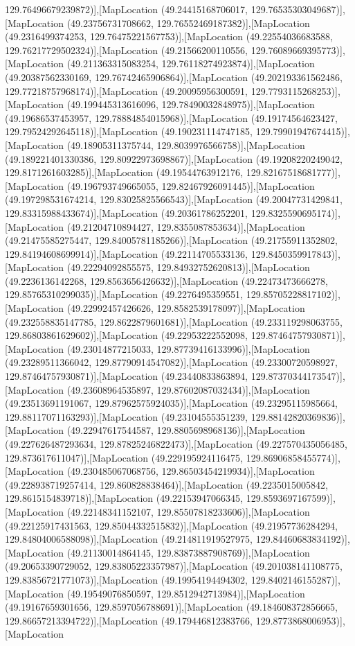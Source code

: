 129.76496679239872)],[MapLocation (49.24415168706017, 129.76535303049687)],[MapLocation (49.23756731708662, 129.76552469187382)],[MapLocation (49.2316499374253, 129.76475221567753)],[MapLocation (49.22554036683588, 129.76217729502324)],[MapLocation (49.21566200110556, 129.76089669395773)],[MapLocation (49.211363315083254, 129.76118274923874)],[MapLocation (49.20387562330169, 129.76742465906864)],[MapLocation (49.202193361562486, 129.77218757968174)],[MapLocation (49.20095956300591, 129.7793115268253)],[MapLocation (49.199445313616096, 129.78490032848975)],[MapLocation (49.19686537453957, 129.78884854015968)],[MapLocation (49.19174564623427, 129.79524292645118)],[MapLocation (49.190231114747185, 129.79901947674415)],[MapLocation (49.18905311375744, 129.8039976566758)],[MapLocation (49.189221401330386, 129.80922973698867)],[MapLocation (49.19208220249042, 129.8171261603285)],[MapLocation (49.19544763912176, 129.82167518681777)],[MapLocation (49.196793749665055, 129.82467926091445)],[MapLocation (49.197298531674214, 129.83025825566543)],[MapLocation (49.20047731429841, 129.83315988433674)],[MapLocation (49.20361786252201, 129.8325590695174)],[MapLocation (49.21204710894427, 129.8355087853634)],[MapLocation (49.21475585275447, 129.84005781185266)],[MapLocation (49.21755911352802, 129.84194608699914)],[MapLocation (49.22114705533136, 129.8450359917843)],[MapLocation (49.22294092855575, 129.84932752620813)],[MapLocation (49.2236136142268, 129.8563656426632)],[MapLocation (49.22473473666278, 129.85765310299035)],[MapLocation (49.2276495359551, 129.85705228817102)],[MapLocation (49.22992457426626, 129.8582539178097)],[MapLocation (49.232558835147785, 129.8622879601681)],[MapLocation (49.233119298063755, 129.86803861629602)],[MapLocation (49.22953222552098, 129.87464757930871)],[MapLocation (49.23014877215033, 129.87739416133996)],[MapLocation (49.23289511366042, 129.87790914547082)],[MapLocation (49.23300720598927, 129.87464757930871)],[MapLocation (49.23440833863894, 129.87370344173547)],[MapLocation (49.23608964535897, 129.87602087032434)],[MapLocation (49.23513691191067, 129.87962575924035)],[MapLocation (49.23295115985664, 129.88117071163293)],[MapLocation (49.23104555351239, 129.88142820369836)],[MapLocation (49.22947617544587, 129.8805698968136)],[MapLocation (49.227626487293634, 129.87825246822473)],[MapLocation (49.227570435056485, 129.873617611047)],[MapLocation (49.229195924116475, 129.86906858455774)],[MapLocation (49.230485067068756, 129.86503454219934)],[MapLocation (49.228938719257414, 129.860828838464)],[MapLocation (49.2235015005842, 129.8615154839718)],[MapLocation (49.22153947066345, 129.8593697167599)],[MapLocation (49.22148341152107, 129.85507818233606)],[MapLocation (49.22125917431563, 129.85044332515832)],[MapLocation (49.21957736284294, 129.84804006588098)],[MapLocation (49.214811919527975, 129.84460683834192)],[MapLocation (49.21130014864145, 129.83873887908769)],[MapLocation (49.20653390729052, 129.83805223357987)],[MapLocation (49.201038141108775, 129.83856721771073)],[MapLocation (49.19954194494302, 129.8402146155287)],[MapLocation (49.19549076850597, 129.8512942713984)],[MapLocation (49.19167659301656, 129.8597056788691)],[MapLocation (49.184608372856665, 129.86657213394722)],[MapLocation (49.179446812383766, 129.8773868006953)],[MapLocation 